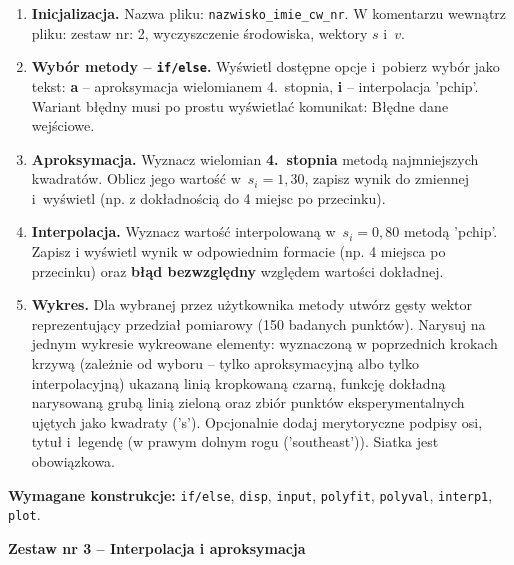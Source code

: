 \documentclass[a4paper,11pt]{article}
\begin{document}
\begin{enumerate}[leftmargin=*, label=\textbf{\arabic*.}, itemsep=2pt]

  \item \textbf{Inicjalizacja.}
    Nazwa pliku: \texttt{nazwisko\_imie\_cw\_nr}. W komentarzu wewnątrz pliku: zestaw nr: 2, wyczyszczenie środowiska, wektory $s$ i~$v$.

  \item \textbf{Wybór metody -- \texttt{if/else}.}
    Wyświetl dostępne opcje i~pobierz wybór jako tekst: \textbf{a} -- aproksymacja wielomianem 4.~stopnia, \textbf{i} -- interpolacja 'pchip'. Wariant błędny musi po prostu wyświetlać komunikat: Błędne dane wejściowe.

  \item \textbf{Aproksymacja.}
    Wyznacz wielomian \textbf{4.~stopnia} metodą najmniejszych kwadratów. Oblicz jego wartość w~$s_i = 1{,}30$, zapisz wynik do zmiennej i~wyświetl (np. z dokładnością do 4 miejsc po przecinku).

  \item \textbf{Interpolacja.}
    Wyznacz wartość interpolowaną w~$s_i = 0{,}80$ metodą 'pchip'. Zapisz i wyświetl wynik w odpowiednim formacie (np. 4 miejsca po przecinku) oraz \textbf{błąd bezwzględny} względem wartości dokładnej.

  \item \textbf{Wykres.}
    Dla wybranej przez użytkownika metody utwórz gęsty wektor reprezentujący przedział pomiarowy (150 badanych punktów). Narysuj na jednym wykresie wykreowane elementy: wyznaczoną w poprzednich krokach krzywą (zależnie od wyboru -- tylko aproksymacyjną albo tylko interpolacyjną) ukazaną linią kropkowaną czarną, funkcję dokładną narysowaną grubą linią zieloną oraz zbiór punktów eksperymentalnych ujętych jako kwadraty ('s'). Opcjonalnie dodaj merytoryczne podpisy osi, tytuł i~legendę (w prawym dolnym rogu ('southeast')). Siatka jest obowiązkowa.

\end{enumerate}

\vspace{0.3cm}
\begin{ramka}
\textbf{Wymagane konstrukcje:}
\texttt{if/else}, \texttt{disp}, \texttt{input}, \texttt{polyfit}, \texttt{polyval}, \texttt{interp1}, \texttt{plot}.
\end{ramka}

\clearpage
\begin{center}
  {\large\bfseries Zestaw nr 3 \quad -- \quad Interpolacja i aproksymacja}
\end{center}
\hrulefill
\vspace{0.4cm}
\end{document}
